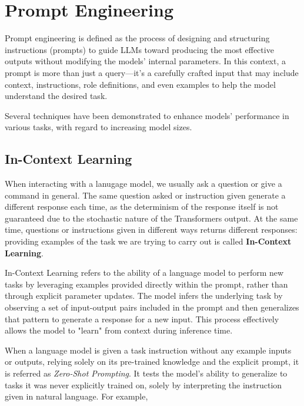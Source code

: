 \section{Prompt Engineering}

Prompt engineering is defined as the process of designing and structuring instructions (prompts) to guide LLMs toward producing the most effective outputs without modifying the models’ internal parameters. In this context, a prompt is more than just a query—it’s a carefully crafted input that may include context, instructions, role definitions, and even examples to help the model understand the desired task.\cite{sahoo2024systematicsurveypromptengineering}

Several techniques have been demonstrated to enhance models' performance in various tasks, with regard to increasing model sizes.\cite{brown2020language}


\subsection{In-Context Learning}
\label{sec:in-context-learning}

When interacting with a lanugage model, we usually ask a question or give a command in general. The same question asked or instruction given generate a different response each time, as the determinism of the response itself is not guaranteed due to the stochastic nature of the Transformers output. At the same time, questions or instructions given in different ways returns different responses: providing examples of the task we are trying to carry out is called \textbf{In-Context Learning}.

In-Context Learning refers to the ability of a language model to perform new tasks by leveraging examples provided directly within the prompt, rather than through explicit parameter updates. The model infers the underlying task by observing a set of input-output pairs included in the prompt and then generalizes that pattern to generate a response for a new input. This process effectively allows the model to "learn" from context during inference time.

When a language model is given a task instruction without any example inputs or outputs, relying solely on its pre-trained knowledge and the explicit prompt, it is referred as \textit{Zero-Shot Prompting}.
It tests the model’s ability to generalize to tasks it was never explicitly trained on, solely by interpreting the instruction given in natural language. For example,

